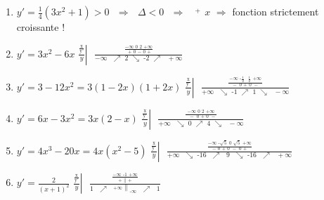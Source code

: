 \begin{solution}
\begin{enumerate}
\item ${y}'=\frac{1}{4}\left( 3{{x}^{2}}+1 \right)>0\text{ }\Rightarrow \text{ }\Delta <0\text{ }\Rightarrow \text{ }\overset{+}{\mathop{\overline{\to }}}\,x$ $\Rightarrow $ fonction strictement croissante !

\item ${y}'=3{{x}^{2}}-6x$
$\left. \frac{\frac{\text{x}}{{\text{{y}'}}}}{y} \right|\text{ }\frac{\frac{-\infty \text{                    0                   2               +}\infty }{\text{   +           0        }-\text{       0        +}}}{-\infty \text{      }\nearrow \text{        2        }\searrow \text{     -2      }\nearrow \text{ }+\infty }$

\item ${y}'=3-12{{x}^{2}}=3\left( 1-2x \right)\left( 1+2x \right)$
$\left. \frac{\frac{\text{x}}{{\text{{y}'}}}}{y} \right|\text{ }\frac{\frac{-\infty \text{                 -}\frac{\text{1}}{\text{2}}\text{                   }\frac{\text{1}}{\text{2}}\text{             +}\infty }{\text{   }-\text{         0          +         0      }-\text{  }}}{+\infty \text{     }\searrow \text{       -1       }\nearrow \text{        1     }\searrow \text{  }-\infty }$

\item ${y}'=6x-3{{x}^{2}}=3x\left( 2-x \right)$
$\left. \frac{\frac{\text{x}}{{\text{{y}'}}}}{y} \right|\text{ }\frac{\frac{-\infty \text{                  0                   2              +}\infty }{\text{  }-\text{         0        +         0       }-}}{+\infty \text{     }\searrow \text{        0      }\nearrow \text{       4      }\searrow \text{ }-\infty }$

\item ${y}'=4{{x}^{3}}-20x=4x\left( {{x}^{2}}-5 \right)$
$\left. \frac{\frac{\text{x}}{{\text{{y}'}}}}{y} \right|\text{ }\frac{\frac{-\infty \text{         -}\sqrt{5}\text{             0               }\sqrt{\text{5}}\text{           +}\infty }{-\text{     0       +      0      }-\text{      0      +}}}{+\infty \text{   }\searrow \text{ -}16\text{    }\nearrow \text{     }9\text{    }\searrow \text{    -}16\text{  }\nearrow \text{  }+\infty }$

\item ${y}'=\frac{2}{{{\left( x+1 \right)}^{2}}}$
$\left. \frac{\frac{\text{x}}{{\text{{y}'}}}}{y} \right|\text{ }\frac{\frac{-\infty \text{               -1           +}\infty }{\text{+        }\left. {} \right\|\text{      +}}}{1\text{     }\nearrow \text{     }{{\left. ^{\text{+}\infty } \right\|}_{\text{-}\infty }}\text{    }\nearrow \text{   }1}$


\end{enumerate}
\end{solution}
